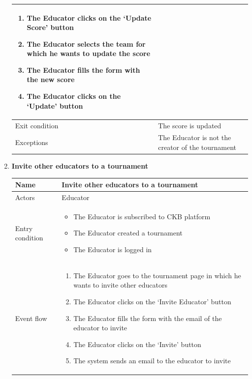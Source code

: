 \begin{enumerate}[label=UC\arabic*:]
\begin{tabular}{|p{3cm}|p{8cm}|}
\begin{enumerate}[label=\arabic*.]
            \item The Educator clicks on the `Update Score' button
            \item The Educator selects the team for which he wants to update the score
            \item The Educator fills the form with the new score
            \item The Educator clicks on the `Update' button
        \end{enumerate}
        \\
        \hline
        Exit condition & The score is updated \\
        \hline
        Exceptions & The Educator is not the creator of the tournament \\
        \hline
    \end{tabular}
    \item \textbf{Invite other educators to a tournament} \\
    \begin{tabular}{|p{3cm}|p{8cm}|}
        \hline
        Name & Invite other educators to a tournament \\
        \hline
        Actors & Educator \\
        \hline
        Entry condition &
        \begin{itemize}
            \item The Educator is subscribed to CKB platform
            \item The Educator created a tournament
            \item The Educator is logged in
        \end{itemize}
        \\
        \hline
        Event flow & 
        \begin{enumerate}[label=\arabic*.]
            \item The Educator goes to the tournament page in which he wants to invite other educators
            \item The Educator clicks on the `Invite Educator' button
            \item The Educator fills the form with the email of the educator to invite
            \item The Educator clicks on the `Invite' button
            \item The system sends an email to the educator to invite
        \end{enumerate}
        \\
        \hline

\end{tabular}
\end{enumerate}
